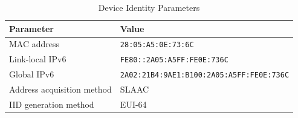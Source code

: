 \begin{table}[H]
    \centering
    \caption{Device Identity Parameters}
    \label{tab:device-identity-parameters}
    \begin{tabularx}{\textwidth}{p{} L}
        \toprule
        \textbf{\color{white}Parameter} & \textbf{\color{white}Value} \\
        \midrule
        MAC address & \texttt{28:05:A5:0E:73:6C} \\
        Link-local IPv6 & \texttt{\small FE80::2A05:A5FF:FE0E:736C} \\
        Global IPv6 & \texttt{\small 2A02:21B4:9AE1:B100:2A05:A5FF:FE0E:736C} \\
        Address acquisition method & SLAAC \\
        IID generation method & EUI-64 \\
        \bottomrule
    \end{tabularx}
\end{table}

